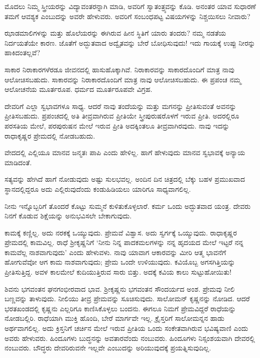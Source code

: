 ಮೊದಲು ನಿಮ್ಮ ಸ್ತ್ರೀಯರನ್ನು ವಿದ್ಯಾವಂತರನ್ನಾಗಿ ಮಾಡಿ, ಅವರಿಗೆ ಸ್ವಾತಂತ್ರ್ಯವನ್ನು ಕೊಡಿ. ಅನಂತರ ಯಾವ ಸುಧಾರಣೆ ತಮಗೆ ಆವಶ್ಯಕ ಎಂಬುದನ್ನು ಅವರೇ ಹೇಳುವರು. ಅವರಿಗೆ ಸಂಬಂಧಪಟ್ಟ ವಿಷಯಗಳನ್ನು ನಿಶ್ಚಯಿಸಲು ನೀವಾರು?

ಝಾಡಮಾಲಿಗಳನ್ನು ಮತ್ತು ಹೊಲೆಯರನ್ನು ಈಗಿರುವ ಹೀನ ಸ್ಥಿತಿಗೆ ಯಾರು ತಂದರು? ನಮ್ಮ ನಡತೆಯ ನಿರ್ದಯತೆಯೇ ಕಾರಣ. ಜೊತೆಗೆ ಅದ್ಭುತವಾದ ಅದ್ವೈತವನ್ನು ಬೇರೆ ಬೋಧಿಸುವುದು! ಇದು ಗಾಯಕ್ಕೆ ಉಪ್ಪು ನೀರನ್ನು ಹಾಕಿದಂತಲ್ಲವೆ?

ಸಾಕಾರ ನಿರಾಕಾರಗಳೆರಡೂ ಜೀವನದಲ್ಲಿ ಹಾಸುಹೊಕ್ಕಾಗಿವೆ. ನಿರಾಕಾರವನ್ನು ಸಾಕಾರದೊಂದಿಗೆ ಮಾತ್ರ ನಾವು ಆಲೋಚಿಸಬಹುದು. ಸಾಕಾರವನ್ನು ನಿರಾಕಾರದೊಂದಿಗೆ ಮಾತ್ರ ನಾವು ಆಲೋಚಿಸಬಹುದು. ಈ ಪ್ರಪಂಚ ನಮ್ಮ ಆಲೋಚನೆಯ ಮೂರ್ತರೂಪ. ಧರ್ಮದ ಮೂರ್ತರೂಪವೇ ವಿಗ್ರಹ.

ದೇವರಿಗೆ ಎಲ್ಲಾ ಸ್ವಭಾವಗಳೂ ಸಾಧ್ಯ. ಆದರೆ ನಾವು ತಂದೆಯನ್ನು ಮತ್ತು ಮಗನನ್ನು ಪ್ರೀತಿಸುವಂತೆ ಅವನನ್ನು ಪ್ರೀತಿಸಬಹುದು. ಪ್ರಪಂಚದಲ್ಲಿ ಅತಿ ತೀವ್ರವಾಗಿರುವ ಪ್ರೀತಿಯೇ ಸ್ತ್ರೀಪುರುಷರೊಳಗೆ ಇರುವ ಪ್ರೀತಿ. ಅದರಲ್ಲಿರೂ ಪರಸತಿಯ ಮೇಲೆ, ಪರಪುರುಷನ ಮೇಲೆ ಇರುವ ಪ್ರೀತಿ ಅದಕ್ಕಿಂತಲೂ ತೀವ್ರವಾಗಿರವುದು. ನಾವು ಇದನ್ನು ರಾಧಾಕೃಷ್ಣರ ಪ್ರೇಮದಲ್ಲಿ ನೋಡಬಹುದು.

ವೇದದಲ್ಲಿ ಎಲ್ಲಿಯೂ ಮಾನವ ಜನ್ಮತಃ ಪಾಪಿ ಎಂದು ಹೇಳಿಲ್ಲ. ಹಾಗೆ ಹೇಳುವುದು ಮಾನವ ಸ್ವಭಾವಕ್ಕೆ ಅನ್ಯಾಯ ಮಾಡಿದಂತೆ.

ಸತ್ಯವನ್ನು ಹೇಗಿದೆ ಹಾಗೆ ನೋಡುವುದು ಅಷ್ಟು ಸುಲಭವಲ್ಲ. ಅಂದಿನ ದಿನ ಚಿತ್ರದಲ್ಲಿ ಬೆಕ್ಕು ಬಹಳ ಪ್ರಮುಖವಾದ ಸ್ಥಾನದಲ್ಲಿದ್ದರೂ ಅದು ಎಲ್ಲಿರುವುದೆಂದು ಕಂಡುಹಿಡಿಯಲು ಯಾರಿಗೂ ಸಾಧ್ಯವಾಗಲಿಲ್ಲ.

ನೀನು ಇನ್ನೊಬ್ಬರಿಗೆ ತೊಂದರೆ ಕೊಟ್ಟು ಸುಮ್ಮನೆ ಕುಳಿತುಕೊಳ್ಳಲಾರೆ. ಕರ್ಮ ಒಂದು ಅದ್ಭುತವಾದ ಯಂತ್ರ. ದೇವರು ನಿನಗೆ ಕೊಡುವ ಶಿಕ್ಷೆಯನ್ನು ಅನುಭವಿಸಲೇ ಬೇಕಾಗುವುದು.

ಕಾಮಕ್ಕೆ ಕಣ್ಣಿಲ್ಲ. ಅದು ನರಕಕ್ಕೆ ಒಯ್ಯುವುದು. ಪ್ರೇಮವೆ ವಿಶ್ವಾಸ. ಅದು ಸ್ವರ್ಗಕ್ಕೆ ಒಯ್ಯುವುದು. ರಾಧಾಕೃಷ್ಣರ ಪ್ರೇಮದಲ್ಲಿ ಕಾಮವಿಲ್ಲ. ರಾಧೆ ಶ‍್ರೀಕೃಷ್ಣನಿಗೆ ‘ನೀನು ನಿನ್ನ ಪಾದಕಮಲಗಳನ್ನು ನನ್ನ ಹೃದಯದ ಮೇಲೆ ಇಟ್ಟರೆ ನನ್ನ ಕಾಮವೆಲ್ಲ ನಾಶವಾಗುವುದು’ ಎಂದು ಹೇಳುವಳು. ನಾವು ಯಾವಾಗ ಆಕಾರವನ್ನು ಮೀರಿ ಆತ್ಮ ಭಾವನೆಗೆ ಹೋಗುವೆವೋ ಆಗ ಕಾಮ ನಾಶವಾಗುವುದು; ಪ್ರೇಮ ಒಂದೇ ಉಳಿಯುವುದು. ಕವಿಯೊಬ್ಬ ಅಗಸಗಿತ್ತಿಯನ್ನು ಪ್ರೀತಿಸುತ್ತಿದ್ದ. ಅವಳ ಕಾಲಮೇಲೆ ಕುದಿಯುತ್ತಿರುವ ಸಾರು ಬಿತ್ತು. ಅದಕ್ಕೆ ಕವಿಯ ಕಾಲು ಸುಟ್ಟುಹೋಯಿತು!

ಶಿವನು ಭಗವಂತನ ಘನಗಂಭೀರವಾದ ಭಾವ. ಶ‍್ರೀಕೃಷ್ಣನು ಭಗವಂತನ ಸೌಂದರ್ಯದ ಅಂಶ. ಪ್ರೇಮವು ನೀಲಿ ಬಣ್ಣವನ್ನು ತಾಳುವುದು. ನೀಲಿಯು ತೀವ್ರ ಪ್ರೇಮವನ್ನು ಸೂಚಿಸುವುದು. ಸಾಲೋಮನ್ ಕೃಷ್ಣನನ್ನು ನೋಡಿದ. ಆದರೆ ಭರತಖಂಡದಲ್ಲಿ ಕೃಷ್ಣನು ಎಲ್ಲರಿಗೂ ಕಾಣಿಸಿಕೊಳ್ಳಲು ಬಂದನು. ಈಗಲೂ ನಿಮಗೆ ಪ್ರೇಮವಿದ್ದರೆ ರಾಧೆಯನ್ನು ನೋಡಬಲ್ಲಿರಿ. ರಾಧೆಯಾಗಿ ಮುಕ್ತಿ ಹೊಂದಿ, ಬೇರೆ ಮಾರ್ಗವೇ ಇಲ್ಲ. ಕ್ರೈಸ್ತರಿಗೆ ಸಾಲೋಮನ್ನನ ಹಾಡು ಅರ್ಥವಾಗಲಿಲ್ಲ. ಅದು ಕ್ರಿಸ್ತನಿಗೆ ಚರ್ಚಿನ ಮೇಲೆ ಇರುವ ಪ್ರೀತಿಯ ಒಂದು ಸಂಕೇತವಾಗಿರುವ ಭವಿಷ್ಯವಾಣಿ ಎಂದು ಅವರು ಹೇಳುವರು. ಹಿಂದೂಗಳು ಬುದ್ಧನನ್ನು ಅವತಾರವೆಂದು ನಂಬುವರು. ಹಿಂದೂಗಳು ನಿಸ್ಸಂಶಯವಾಗಿ ದೇವರಲ್ಲಿ ನಂಬುವರು. ಬೌದ್ಧರು ದೇವರಿರುವನೇ ಇಲ್ಲವೇ ಎಂಬುದನ್ನು ಅರಿಯುವುದಕ್ಕೆ ಪ್ರಯತ್ನಿಸುವುದಿಲ್ಲ.

